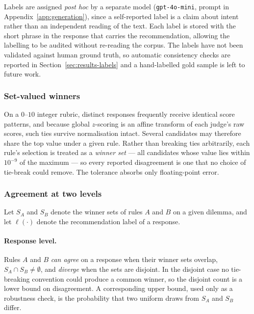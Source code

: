 \documentclass[10pt,twocolumn,a4paper]{article}
\begin{document}
Labels are assigned \emph{post hoc} by a separate model
(\texttt{gpt-4o-mini}, prompt in Appendix~\ref{app:generation}), since
a self-reported label is a claim about intent rather than an
independent reading of the text. Each label is
stored with the short phrase in the response that carries the
recommendation, allowing the labelling to be audited without re-reading
the corpus. The labels have not been validated against human ground
truth, so automatic consistency checks are reported in
Section~\ref{sec:results-labels} and a hand-labelled gold sample is
left to future work.

\subsubsection{Set-valued winners}
\label{sec:ties}




On a $0$--$10$ integer rubric, distinct responses frequently receive
identical score patterns, and because global $z$-scoring is an affine
transform of each judge's raw scores, such ties survive normalisation
intact. Several candidates may therefore share the top value under a given
rule. Rather than breaking ties arbitrarily, each rule's selection is
treated as a \emph{winner set} --- all candidates whose value lies within
$10^{-9}$ of the maximum --- so every reported disagreement is one that no
choice of tie-break could remove. The tolerance absorbs only
floating-point error.

\subsubsection{Agreement at two levels}
\label{sec:two-levels}

Let $S_A$ and $S_B$ denote the winner sets of rules $A$ and $B$ on a given
dilemma, and let $\ell(\cdot)$ denote the recommendation label of a response.

\paragraph{Response level.}
Rules $A$ and $B$ \emph{can agree} on a response when their winner sets
overlap, $S_A \cap S_B \neq \emptyset$, and \emph{diverge} when the sets
are disjoint. In the disjoint case no tie-breaking convention could
produce a common winner, so the disjoint count is a lower bound on
disagreement. A corresponding upper bound, used only as a robustness
check, is the probability that two uniform draws from $S_A$ and $S_B$
differ.
\end{document}

